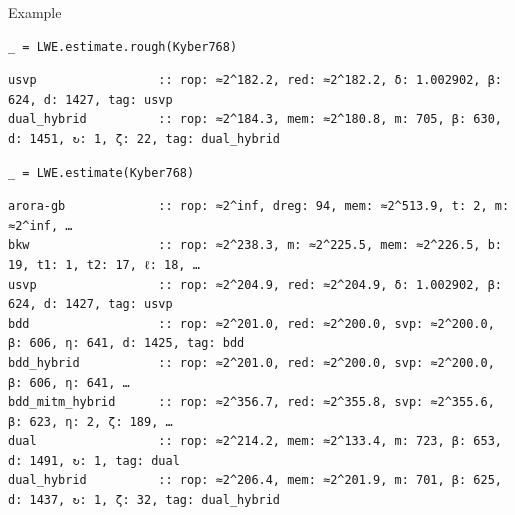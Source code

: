 \documentclass[table,10pt,aspectratio=169]{beamer}
\begin{document}
\begin{frame}[label={sec:org235cd0f},fragile]{Example}
 \lstset{language=Python,label= ,caption= ,captionpos=b,numbers=none}
\begin{lstlisting}
_ = LWE.estimate.rough(Kyber768)
\end{lstlisting}

\begin{verbatim}
usvp                 :: rop: ≈2^182.2, red: ≈2^182.2, δ: 1.002902, β: 624, d: 1427, tag: usvp
dual_hybrid          :: rop: ≈2^184.3, mem: ≈2^180.8, m: 705, β: 630, d: 1451, ↻: 1, ζ: 22, tag: dual_hybrid
\end{verbatim}


\lstset{language=Python,label= ,caption= ,captionpos=b,numbers=none}
\begin{lstlisting}
_ = LWE.estimate(Kyber768)
\end{lstlisting}

\begin{verbatim}
arora-gb             :: rop: ≈2^inf, dreg: 94, mem: ≈2^513.9, t: 2, m: ≈2^inf, …
bkw                  :: rop: ≈2^238.3, m: ≈2^225.5, mem: ≈2^226.5, b: 19, t1: 1, t2: 17, ℓ: 18, …
usvp                 :: rop: ≈2^204.9, red: ≈2^204.9, δ: 1.002902, β: 624, d: 1427, tag: usvp
bdd                  :: rop: ≈2^201.0, red: ≈2^200.0, svp: ≈2^200.0, β: 606, η: 641, d: 1425, tag: bdd
bdd_hybrid           :: rop: ≈2^201.0, red: ≈2^200.0, svp: ≈2^200.0, β: 606, η: 641, …
bdd_mitm_hybrid      :: rop: ≈2^356.7, red: ≈2^355.8, svp: ≈2^355.6, β: 623, η: 2, ζ: 189, …
dual                 :: rop: ≈2^214.2, mem: ≈2^133.4, m: 723, β: 653, d: 1491, ↻: 1, tag: dual
dual_hybrid          :: rop: ≈2^206.4, mem: ≈2^201.9, m: 701, β: 625, d: 1437, ↻: 1, ζ: 32, tag: dual_hybrid
\end{verbatim}
\end{frame}
\end{document}
